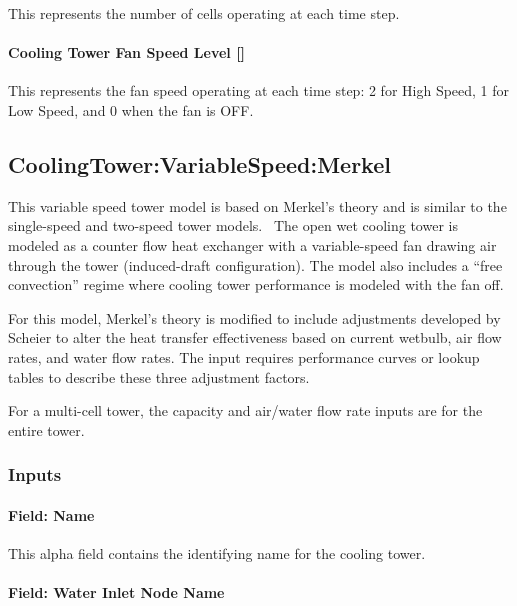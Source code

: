 This represents the number of cells operating at each time step.

\paragraph{Cooling Tower Fan Speed Level {[]}}\label{cooling-tower-fan-speed-level}

This represents the fan speed operating at each time step: 2 for High Speed, 1 for Low Speed, and 0 when the fan is OFF.

\subsection{CoolingTower:VariableSpeed:Merkel}\label{coolingtowervariablespeedmerkel}

This variable speed tower model is based on Merkel's theory and is similar to the single-speed and two-speed tower models.~ The open wet cooling tower is modeled as a counter flow heat exchanger with a variable-speed fan drawing air through the tower (induced-draft configuration). The model also includes a ``free convection'' regime where cooling tower performance is modeled with the fan off.

For this model, Merkel's theory is modified to include adjustments developed by Scheier to alter the heat transfer effectiveness based on current wetbulb, air flow rates, and water flow rates. The input requires performance curves or lookup tables to describe these three adjustment factors.

For a multi-cell tower, the capacity and air/water flow rate inputs are for the entire tower.

\subsubsection{Inputs}\label{inputs-2-006}

\paragraph{Field: Name}\label{field-name-1-005}

This alpha field contains the identifying name for the cooling tower.

\paragraph{Field: Water Inlet Node Name}\label{field-water-inlet-node-name-2}

